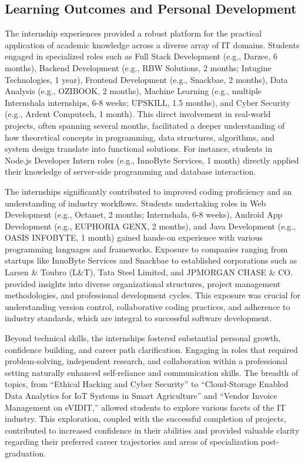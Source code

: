 \documentclass[11pt,a4paper]{article}
\newenvironment{card}{
    \begin{tcolorbox}[
        enhanced,
        colback=cardback,
        colframe=border,
        sharp corners,
        boxrule=0.5pt,
        drop shadow,
        drop shadow={shadow xshift=1mm,shadow yshift=-1mm,fill=border!50},
        boxsep=3mm,
        left=5mm, right=5mm, top=5mm, bottom=5mm,
        width=\textwidth,
        nobeforeafter
    ]
}{\end{tcolorbox}}
\begin{document}
\begin{card}
    \subsection*{\textcolor{accent}{Learning Outcomes and Personal Development}}
    \vspace{0.3cm}
    The internship experiences provided a robust platform for the practical application of academic knowledge across a diverse array of IT domains. Students engaged in specialized roles such as Full Stack Development (e.g., Darzee, 6 months), Backend Development (e.g., RBW Solutions, 2 months; Intugine Technologies, 1 year), Frontend Development (e.g., Snackbae, 2 months), Data Analysis (e.g., OZIBOOK, 2 months), Machine Learning (e.g., multiple Internshala internships, 6-8 weeks; UPSKILL, 1.5 months), and Cyber Security (e.g., Ardent Computech, 1 month). This direct involvement in real-world projects, often spanning several months, facilitated a deeper understanding of how theoretical concepts in programming, data structures, algorithms, and system design translate into functional solutions. For instance, students in Node.js Developer Intern roles (e.g., InnoByte Services, 1 month) directly applied their knowledge of server-side programming and database interaction.

    The internships significantly contributed to improved coding proficiency and an understanding of industry workflows. Students undertaking roles in Web Development (e.g., Octanet, 2 months; Internshala, 6-8 weeks), Android App Development (e.g., EUPHORIA GENX, 2 months), and Java Development (e.g., OASIS INFOBYTE, 1 month) gained hands-on experience with various programming languages and frameworks. Exposure to companies ranging from startups like InnoByte Services and Snackbae to established corporations such as Larsen \& Toubro (L\&T), Tata Steel Limited, and JPMORGAN CHASE \& CO. provided insights into diverse organizational structures, project management methodologies, and professional development cycles. This exposure was crucial for understanding version control, collaborative coding practices, and adherence to industry standards, which are integral to successful software development.

    Beyond technical skills, the internships fostered substantial personal growth, confidence building, and career path clarification. Engaging in roles that required problem-solving, independent research, and collaboration within a professional setting naturally enhanced self-reliance and communication skills. The breadth of topics, from ``Ethical Hacking and Cyber Security'' to ``Cloud-Storage Enabled Data Analytics for IoT Systems in Smart Agriculture'' and ``Vendor Invoice Management on eVIDIT,'' allowed students to explore various facets of the IT industry. This exploration, coupled with the successful completion of projects, contributed to increased confidence in their abilities and provided valuable clarity regarding their preferred career trajectories and areas of specialization post-graduation.
\end{card}
\end{document}
